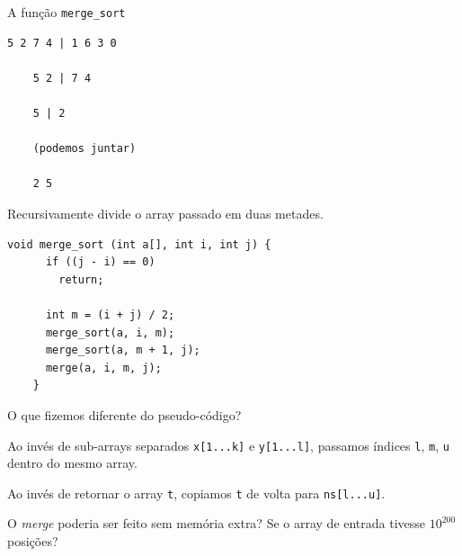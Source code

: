 \documentclass{beamer}
\begin{document}
\begin{frame}{A função \texttt{merge\_sort}}

  \begin{lstlisting}[style=code]
    5 2 7 4 | 1 6 3 0

    5 2 | 7 4

    5 | 2

    (podemos juntar)

    2 5 
  \end{lstlisting}

  Recursivamente divide o array passado em duas metades.

  \framebreak

  \begin{lstlisting}[style=normalc,caption=src/merge.c]
    void merge_sort (int a[], int i, int j) {
      if ((j - i) == 0)
        return;
      
      int m = (i + j) / 2;
      merge_sort(a, i, m);
      merge_sort(a, m + 1, j);  
      merge(a, i, m, j);
    }
  \end{lstlisting}

  \framebreak

  O que fizemos diferente do pseudo-código?

  Ao invés de sub-arrays separados \texttt{x[1...k]} e
  \texttt{y[1...l]}, passamos índices \texttt{l}, \texttt{m},
  \texttt{u} dentro do mesmo array.

  Ao invés de retornar o array \texttt{t}, copiamos \texttt{t} de
  volta para \texttt{ns[l...u]}.

  O \emph{merge} poderia ser feito sem memória extra? Se o array de
  entrada tivesse $10^{200}$ posições?

\end{frame}
\end{document}

